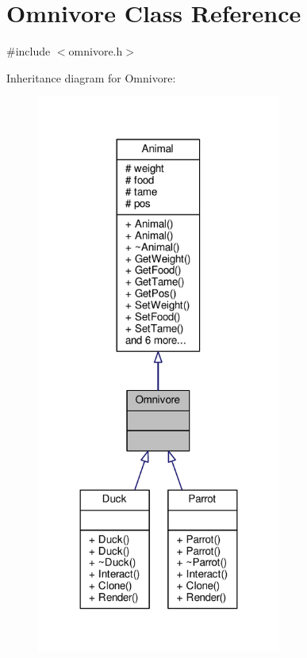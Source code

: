 \hypertarget{classOmnivore}{}\section{Omnivore Class Reference}
\label{classOmnivore}


{\ttfamily \#include $<$omnivore.\+h$>$}



Inheritance diagram for Omnivore\+:
\nopagebreak
\begin{figure}[H]
\begin{center}
\leavevmode
\includegraphics[width=228pt]{classOmnivore__inherit__graph}
\end{center}
\end{figure}


